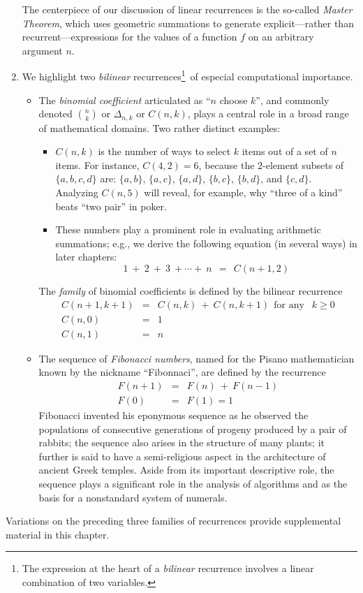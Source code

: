 \begin{enumerate}
\smallskip

The centerpiece of our discussion of linear recurrences is the so-called {\em Master Theorem}, which uses geometric summations to generate explicit---rather than recurrent---expressions for the values of a function $f$ on an arbitrary argument $n$.

\medskip\item
We highlight two {\it bilinear} recurrences\footnote{The expression at the heart of a {\it bilinear} recurrence involves a linear combination of two variables.}~of especial computational importance. 
  \begin{itemize} 
  \item
The {\it binomial coefficient} articulated as ``$n$ choose $k$'', and commonly denoted $\displaystyle {n \choose k}$ or $\Delta_{n,k}$ or $C(n,k)$, plays a central role in a broad range of mathematical domains.  Two rather distinct examples:
       \begin{itemize}
       \item
$C(n,k)$ is the number of ways to select $k$ items out of a set of $n$ items.  For instance, $C(4,2) =6$, because the $2$-element subsets of $\{a, b, c, d\}$ are: $\{a, b\}$, $\{a, c\}$, $\{a, d\}$,  $\{b, c\}$, $\{b, d\}$,  and $\{c,d\}$.  Analyzing $C(n, 5)$ will reveal, for example, why ``three of a kind'' beats ``two pair'' in poker.
       \medskip\item
These numbers play a prominent role in evaluating arithmetic summations; e.g., we derive the following equation (in several ways) in later chapters:
\[ 1 \ + \ 2 \ + \ 3 \ + \cdots + \ n \ \ = \ \ C(n+1, 2) \]
       \end{itemize}
The {\em family} of binomial coefficients is defined by the bilinear recurrence
\begin{eqnarray*}
C(n+1, k+1) & = & C(n, k) \ + \ C(n, k+1) \ \ \mbox{for any } \ \ k \geq 0 \\
C(n, 0) & = & 1 \\
C(n, 1) & = & n 
\end{eqnarray*}

  \medskip\item
The sequence of {\it Fibonacci numbers}, named for the Pisano mathematician known by the nickname ``Fibonnaci'', are defined by the recurrence
\begin{eqnarray*}
F(n+1) & = & F(n) \ + \ F(n-1) \\
F(0) & = & F(1) = 1
\end{eqnarray*}
Fibonacci invented his eponymous sequence as he observed the populations of consecutive generations of progeny produced by a pair of rabbits; the sequence also arises in the structure of many plants; it further is said to have a semi-religious aspect in the architecture
of ancient Greek temples.  Aside from its important descriptive role, the sequence plays a
significant role in the analysis of algorithms and as the basis for a nonstandard system of numerals.
  \end{itemize}
\end{enumerate}
Variations on the preceding three families of recurrences provide supplemental material in this chapter.



